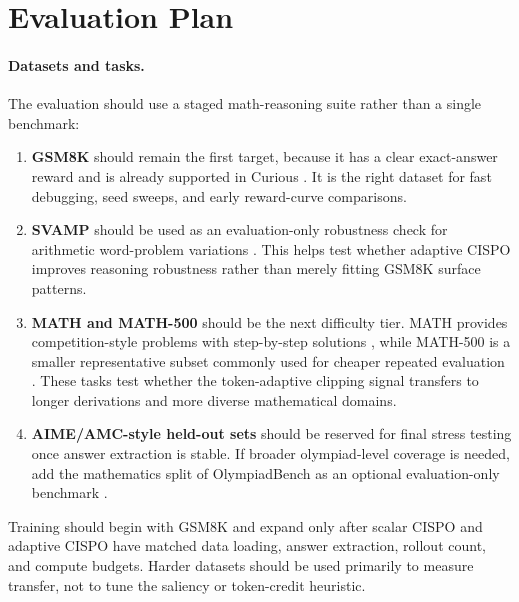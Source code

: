 \documentclass[11pt]{article}
\begin{document}
\section{Evaluation Plan}

\paragraph{Datasets and tasks.}
The evaluation should use a staged math-reasoning suite rather than a single
benchmark:
\begin{enumerate}[leftmargin=*]
  \item \textbf{GSM8K} should remain the first target, because it has a clear
  exact-answer reward and is already supported in Curious
  \cite{cobbe2021gsm8k}. It is the right dataset for fast debugging, seed
  sweeps, and early reward-curve comparisons.
  \item \textbf{SVAMP} should be used as an evaluation-only robustness check for
  arithmetic word-problem variations \cite{patel2021svamp}. This helps test
  whether adaptive CISPO improves reasoning robustness rather than merely fitting
  GSM8K surface patterns.
  \item \textbf{MATH and MATH-500} should be the next difficulty tier.
  MATH provides competition-style problems with step-by-step solutions
  \cite{hendrycks2021math}, while MATH-500 is a smaller representative subset
  commonly used for cheaper repeated evaluation \cite{lightman2023verify}.
  These tasks test whether the token-adaptive clipping signal transfers to
  longer derivations and more diverse mathematical domains.
  \item \textbf{AIME/AMC-style held-out sets} should be reserved for final
  stress testing once answer extraction is stable. If broader olympiad-level
  coverage is needed, add the mathematics split of OlympiadBench as an optional
  evaluation-only benchmark \cite{he2024olympiadbench}.
\end{enumerate}
Training should begin with GSM8K and expand only after scalar CISPO and
adaptive CISPO have matched data loading, answer extraction, rollout count, and
compute budgets. Harder datasets should be used primarily to measure transfer,
not to tune the saliency or token-credit heuristic.
\end{document}
